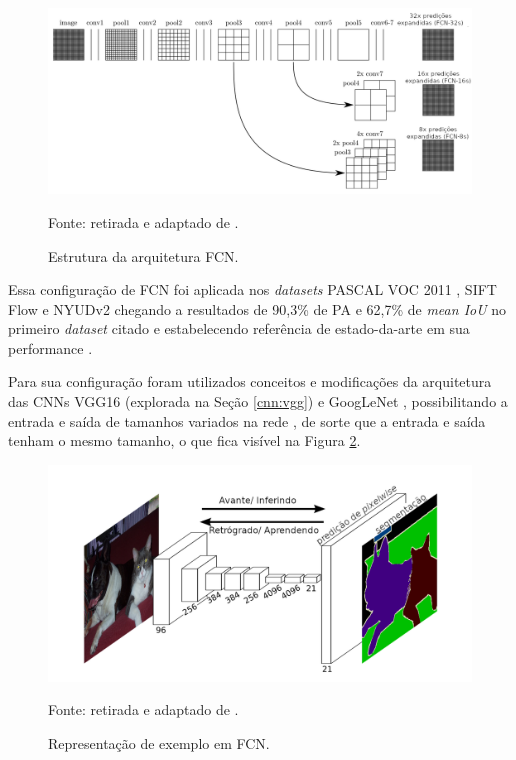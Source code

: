 \begin{figure}[H]
    \centering
    \caption{Estrutura da arquitetura FCN.}
    \includegraphics[width=1\linewidth]{recursos/imagens/semantic/fcn_arch.png}
    \label{semantic:fig:5}

    Fonte: retirada e adaptado de \cite{Shelhamer2016}.
\end{figure}

Essa configuração de FCN foi aplicada nos \textit{datasets} PASCAL VOC 2011 \citep{everingham2010pascal}, SIFT Flow \citep{Liu2011} e NYUDv2 \citep{Silberman:ECCV12} chegando a resultados de 90,3\% de PA e 62,7\% de \textit{mean IoU} no primeiro \textit{dataset} citado \citep{Ghosh2019} e estabelecendo referência de estado-da-arte em sua performance \citep{Minaee2021}.

Para sua configuração foram utilizados conceitos e modificações da arquitetura das CNNs VGG16 (explorada na Seção \ref{cnn:vgg}) e GoogLeNet \citep{Szegedy2015}, possibilitando a entrada e saída de tamanhos variados na rede \citep{Minaee2021}, de sorte que a entrada e saída tenham o mesmo tamanho, o que fica visível na Figura \ref{semantic:fig:6}.

\begin{figure}[H]
    \centering
    \caption{Representação de exemplo em FCN.}
    \includegraphics[width=1\linewidth]{recursos/imagens/semantic/fcn_example.png}
    \label{semantic:fig:6}

    Fonte: retirada e adaptado de \cite{Shelhamer2016}.
\end{figure}

